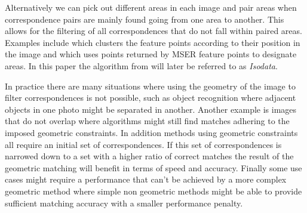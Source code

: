 \documentclass[conference]{IEEEtran}
\begin{document}
%
Alternatively we can pick out different areas in each image and pair 
areas when correspondence pairs are mainly found going from one area to 
another. This allows for the filtering of all correspondences that do 
not fall within paired areas. Examples include \cite{das2008event} which 
clusters the feature points according to their position in the image
and \cite{wu2011robust} which uses points returned by MSER feature 
points to designate areas. In this paper the algorithm from  
\cite{das2008event} will later be referred to as \emph{Isodata}.


In practice there are many situations where using the geometry of the 
image to filter correspondences is not possible, such as object 
recognition where adjacent objects in one photo might be separated in 
another. Another example is images that do not overlap where algorithms 
might still find matches adhering to the imposed geometric constraints.
In addition methods using geometric constraints all require an initial 
set of correspondences. If this set of correspondences is narrowed down 
to a set with a higher ratio of correct matches the result of the 
geometric matching will benefit in terms of speed and accuracy. Finally 
some use cases might require a performance that can't be achieved by a 
more complex geometric method where simple non geometric methods might 
be able to provide sufficient matching accuracy with a smaller 
performance penalty.
\end{document}
